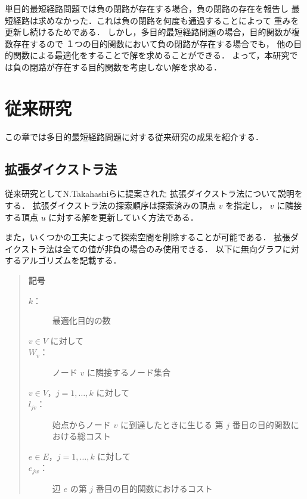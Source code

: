 \documentclass[12pt]{optlab-bachelor}
\begin{document}
単目的最短経路問題では負の閉路が存在する場合，負の閉路の存在を報告し
最短経路は求めなかった．これは負の閉路を何度も通過することによって
重みを更新し続けるためである．
しかし，多目的最短経路問題の場合，目的関数が複数存在するので
１つの目的関数において負の閉路が存在する場合でも，
他の目的関数による最適化をすることで解を求めることができる．
よって，本研究では負の閉路が存在する目的関数を考慮しない解を求める．


\chapter{従来研究}
この章では多目的最短経路問題に対する従来研究の成果を紹介する．

\section{拡張ダイクストラ法}
従来研究としてN.Takahashiら\cite{N.TAKAHASHI1}に提案された
拡張ダイクストラ法について説明をする．
拡張ダイクストラ法の探索順序は探索済みの頂点 $v$ を指定し，
$v$ に隣接する頂点 $u$ に対する解を更新していく方法である．

また，いくつかの工夫によって探索空間を削除することが可能である．
拡張ダイクストラ法は全ての値が非負の場合のみ使用できる．
以下に無向グラフに対するアルゴリズムを記載する．

\begin{quote}
  \textbf{記号}
  \begin{description}
    \item[$k$：] 最適化目的の数
    \item[$v \in V$ に対して]
    \item[$W_v$：] ノード $v$ に隣接するノード集合
    \item[$v \in V$，$j = 1 , \ldots , k$ に対して]
    \item[$l_{jv}$：] 始点からノード $v$ に到達したときに生じる
    第 $j$ 番目の目的関数における総コスト
    \item[$e \in E$，$j = 1 , \ldots , k$ に対して]
    \item[$e_{jw}$：] 辺 $e$ の第 $j$ 番目の目的関数におけるコスト
  \end{description}
\end{quote}
\end{document}
